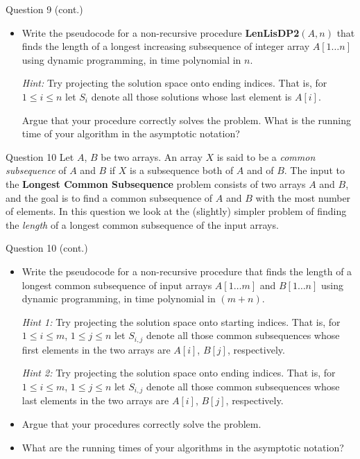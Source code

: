 \documentclass{beamer}
\begin{document}
\begin{frame}{Question 9 (cont.)}
\begin{itemize}
  \item[(b)] Write the pseudocode for a non-recursive procedure \textbf{LenLisDP2}$(A, n)$ that finds the length of a longest increasing subsequence of integer array $A[1\ldots n]$ using dynamic programming, in time polynomial in $n$.

  \textit{Hint:} Try projecting the solution space onto ending indices. That is, for $1 \leq i \leq n$ let $S_i$ denote all those solutions whose last element is $A[i]$.

  Argue that your procedure correctly solves the problem. What is the running time of your algorithm in the asymptotic notation?
\end{itemize}
\end{frame}

\begin{frame}{}
\end{frame}
\begin{frame}{}
\end{frame}

\begin{frame}{Question 10}
Let $A$, $B$ be two arrays. An array $X$ is said to be a \emph{common subsequence} of $A$ and $B$ if $X$ is a subsequence both of $A$ and of $B$. The input to the \textbf{Longest Common Subsequence} problem consists of two arrays $A$ and $B$, and the goal is to find a common subsequence of $A$ and $B$ with the most number of elements. In this question we look at the (slightly) simpler problem of finding the \emph{length} of a longest common subsequence of the input arrays.
\end{frame}

\begin{frame}{Question 10 (cont.)}
\begin{itemize}
  \item[(a)] Write the pseudocode for a non-recursive procedure that finds the length of a longest common subsequence of input arrays $A[1\ldots m]$ and $B[1\ldots n]$ using dynamic programming, in time polynomial in $(m+n)$.

  \textit{Hint 1:} Try projecting the solution space onto starting indices. That is, for $1 \leq i \leq m$, $1 \leq j \leq n$ let $S_{i,j}$ denote all those common subsequences whose first elements in the two arrays are $A[i]$, $B[j]$, respectively.

  \textit{Hint 2:} Try projecting the solution space onto ending indices. That is, for $1 \leq i \leq m$, $1 \leq j \leq n$ let $S_{i,j}$ denote all those common subsequences whose last elements in the two arrays are $A[i]$, $B[j]$, respectively.

  \item[(b)] Argue that your procedures correctly solve the problem.

  \item[(c)] What are the running times of your algorithms in the asymptotic notation?
\end{itemize}
\end{frame}
\end{document}
